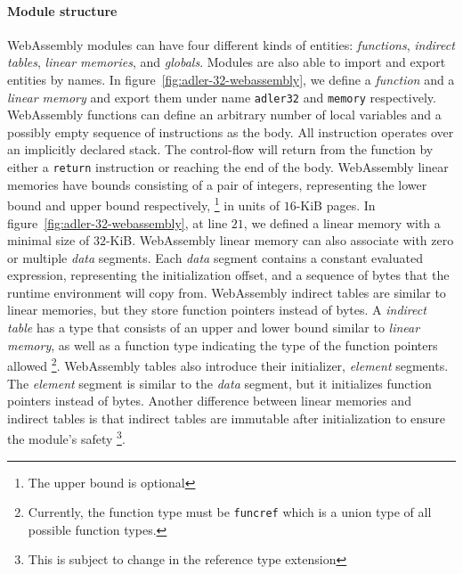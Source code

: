 \paragraph{Module structure}
WebAssembly modules can have four different kinds of entities: \emph{functions},
\emph{indirect tables}, \emph{linear memories}, and \emph{globals}. Modules are
also able to import and export entities by names. In
figure~\ref{fig:adler-32-webassembly}, we define a \emph{function} and a
\emph{linear memory} and export them under name \texttt{adler32} and
\texttt{memory} respectively. WebAssembly functions can define an arbitrary
number of local variables and a possibly empty sequence of instructions as the
body. All instruction operates over an implicitly declared stack. The
control-flow will return from the function by either a \texttt{return}
instruction or reaching the end of the body. WebAssembly linear memories have
bounds consisting of a pair of integers, representing the lower bound and upper
bound respectively, \footnote{The upper bound is optional} in units of $16$-KiB
pages. In figure~\ref{fig:adler-32-webassembly}, at line $21$, we defined a
linear memory with a minimal size of $32$-KiB. WebAssembly linear memory can
also associate with zero or multiple \emph{data} segments. Each \emph{data}
segment contains a constant evaluated expression, representing the
initialization offset, and a sequence of bytes that the runtime environment will
copy from. WebAssembly indirect tables are similar to linear memories, but they
store function pointers instead of bytes. A \emph{indirect table} has a type
that consists of an upper and lower bound similar to \emph{linear memory}, as
well as a function type indicating the type of the function pointers allowed
\footnote{Currently, the function type must be \texttt{funcref} which is a union
  type of all possible function types.}. WebAssembly tables also introduce their
initializer, \emph{element} segments. The \emph{element} segment is similar to
the \emph{data} segment, but it initializes function pointers instead of bytes.
Another difference between linear memories and indirect tables is that indirect
tables are immutable after initialization to ensure the module's safety
\footnote{This is subject to change in the reference type extension}.


